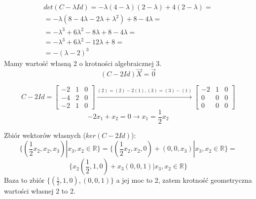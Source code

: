 \documentclass[12pt,a4paper]{article}
\begin{document}
\[
\begin{array}{c}
det(C-\lambda Id) = -\lambda(4-\lambda)(2-\lambda)+4(2-\lambda)=\\
=-\lambda(8-4\lambda-2\lambda+\lambda^2)+8-4\lambda=\\
=-\lambda^3+6\lambda^2-8\lambda+8-4\lambda=\\
=-\lambda^3+6\lambda^2-12\lambda+8=\\
=-(\lambda-2)^3
\end{array}
\]
Mamy wartość własną 2 o krotności algebraicznej 3.
\[
(C-2Id)\vec{X}=\vec{0}
\]

\[
C-2Id=
\left[
\begin{array}{ccc}
-2 & 1 & 0\\
-4 & 2 & 0\\
-2 & 1 & 0
\end{array}\right]
\xrightarrow{(2)=(2)-2(1),(3)=(3)-(1)}
\left[
\begin{array}{ccc}
-2 & 1 & 0\\
0 & 0 & 0\\
0 & 0 & 0
\end{array}\right]
\]
\[
-2x_1+x_2 = 0 \rightarrow x_1=\frac{1}{2}x_2
\]

Zbiór wektorów własnych (\(ker(C-2Id)\)):
\[
\{(\frac{1}{2}x_2,x_2,x_3)| x_3,x_2\in \mathbb{R}\} = 
\{(\frac{1}{2}x_2,x_2,0) + (0,0,x_3)| x_3,x_2\in \mathbb{R}\}=
\]
\[
\{x_2( \frac{1}{2},1,0) + x_3(0,0,1)| x_3,x_2\in \mathbb{R}\}
\]
Baza to zbiór \(\{(\frac{1}{2},1,0),(0,0,1)\}\) a jej moc to 2, zatem krotność geometryczna wartości własnej 2 to 2.
\end{document}
